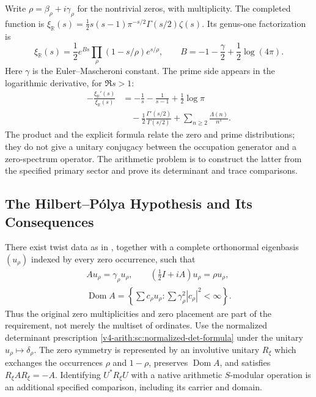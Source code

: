 Write $\rho=\beta_\rho+i\gamma_\rho$ for the nontrivial zeros,
with multiplicity. The completed function is
$\xi_{\mathbb R}(s)=\tfrac12s(s-1)\pi^{-s/2}\Gamma(s/2)\zeta(s)$.
Its genus-one factorization is
\begin{equation}
\label{v4-arith:w5-b:eq:hadamard}
 \xi_{\mathbb R}(s)=\frac12e^{Bs}\prod_\rho(1-s/\rho)e^{s/\rho},
 \qquad B=-1-\frac\gamma2+\frac12\log(4\pi).
\end{equation}
Here $\gamma$ is the Euler--Mascheroni constant. The prime side
appears in the logarithmic derivative, for $\Re s>1$:
\begin{equation}
\label{v4-arith:w5-b:eq:log-deriv-xi}
 \begin{aligned}
 -\frac{\xi_{\mathbb R}'(s)}{\xi_{\mathbb R}(s)}
 &=-\frac1s-\frac1{s-1}+\frac12\log\pi\\
 &\quad-\frac12\frac{\Gamma'(s/2)}{\Gamma(s/2)}
 +\sum_{n\geq2}\frac{\Lambda(n)}{n^s}.
 \end{aligned}
\end{equation}
The product and the explicit formula relate the zero and prime
distributions; they do not give a unitary conjugacy between the
occupation generator and a zero-spectrum operator. The arithmetic
problem is to construct the latter from the specified primary
sector and prove its determinant and trace comparisons.

\subsection{The Hilbert--P\'olya Hypothesis and Its Consequences}
\label{v4-arith:w5-b:twist:consequences}

\begin{hypothesis}
\label{v4-arith:w5-b:hyp:twist-existence}
There exist twist data as in , together
with a complete orthonormal eigenbasis $(u_\rho)$ indexed by every
zero occurrence, such that
\begin{equation}
\label{v4-arith:w5-b:eq:spec-A}
 \begin{gathered}
 Au_\rho=\gamma_\rho u_\rho,\qquad
 (\tfrac12I+iA)u_\rho=\rho u_\rho,\\
 \operatorname{Dom}A=
 \left\{\sum c_\rho u_\rho:\sum\gamma_\rho^2|c_\rho|^2<\infty\right\}.
 \end{gathered}
\end{equation}
Thus the original zero multiplicities and zero placement are part
of the requirement, not merely the multiset of ordinates.
Use the normalized determinant prescription
\eqref{v4-arith:sc:normalized-det-formula} under the unitary
$u_\rho\mapsto\delta_\rho$.
The zero symmetry is represented by an involutive unitary $R_\xi$
which exchanges the occurrences $\rho$ and $1-\rho$, preserves
$\operatorname{Dom}A$, and satisfies $R_\xi A R_\xi=-A$.
Identifying $U^*R_\xi U$ with a native arithmetic $S$-modular
operation is an additional specified comparison, including its
carrier and domain.
\end{hypothesis}

